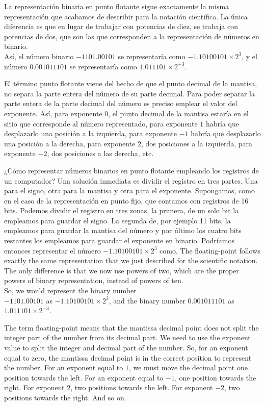 \begin{paracol}{2}
La representación binaria en punto flotante sigue exactamente la misma representación que acabamos de describir para la notación científica. La única diferencia es que en lugar de trabajar con potencias de diez, se trabaja con potencias de dos, que son las que corresponden a la representación de números en binario.\\ Así, el número binario $-1101.00101$ se representaría como $-1.10100101\times 2^3$, y el número $0.001011101$ se representaría como $1.011101\times 2^{-3}$. 

El término punto flotante viene del hecho de que el punto decimal de la mantisa, no separa la parte entera del número de su parte decimal. Para poder separar la parte entera de la parte decimal del número es preciso emplear el valor del exponente. Así, para exponente $0$, el punto decimal de la mantisa estaría en el sitio que corresponde al número representado, para exponente $1$ habría que desplazarlo una posición a la izquierda, para exponente $-1$ habría que desplazarlo una posición a la derecha, para exponente $2$, dos posiciones a la izquierda, para exponente $-2$, dos posiciones a las derecha, etc.

¿Cómo representar números binarios en punto flotante empleando los registros de un computador? Una solución inmediata es dividir el registro en tres partes. Una para el signo, otra para la mantisa y otra para el exponente. Supongamos, como en el caso de la representación en punto fijo, que contamos con registros de 16 bits.  Podemos dividir el registro en tres zonas, la primera, de un solo bit la empleamos para guardar el signo. La segunda de, por ejemplo 11 bits, la empleamos para guardar la mantisa del número y por último los cuatro bits restantes los empleamos para guardar el exponente en binario. Podríamos entonces representar el número  $-1.10100101\times 2^3$ como,
\switchcolumn
The floating-point follows exactly the same representation that we just described for the scientific notation. The only difference is that we now use powers of two, which are the proper powers of binary representation, instead of powers of ten.\\ So, we would represent the binary number\\ $-1101.00101$ as $-1.10100101\times 2^3$, and the binary number $0.001011101$ as $1.011101\times 2^{-3}$.

 The term floating-point means that the mantissa decimal point does not split the integer part of the number from its decimal part. We need to use the exponent value to split the integer and decimal part of the number. So, for an exponent equal to zero, the mantissa decimal point is in the correct position to represent the number. For an exponent equal to $1$, we must move the decimal point one position towards the left. For an exponent equal to $-1$, one position towards the right. For exponent $2$, two positions towards the left. For exponent $-2$, two positions towards the right. And so on.
 

\end{paracol}
